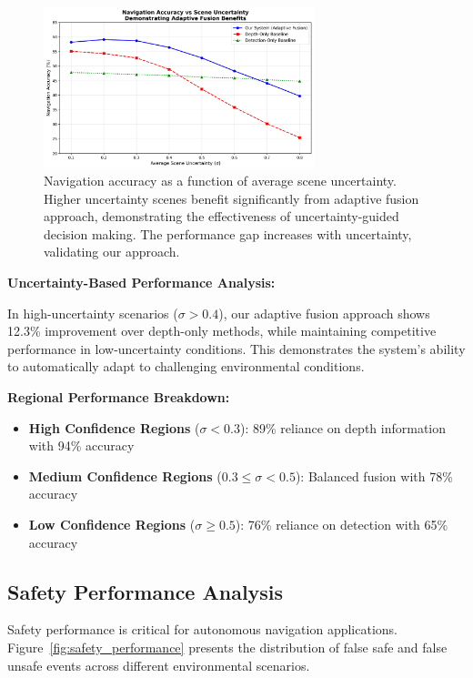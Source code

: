 \documentclass[12pt,oneside]{book}
\newcommand{\figref}[1]{Figure~\ref{#1}}
\begin{document}
\begin{figure}[ht]
\centering
\includegraphics[width=0.7\textwidth]{uncertainty_analysis.png}
\caption{Navigation accuracy as a function of average scene uncertainty. Higher uncertainty scenes benefit significantly from adaptive fusion approach, demonstrating the effectiveness of uncertainty-guided decision making. The performance gap increases with uncertainty, validating our approach.}
\label{fig:uncertainty_performance}
\end{figure}

\textbf{Uncertainty-Based Performance Analysis:}

In high-uncertainty scenarios ($\sigma > 0.4$), our adaptive fusion approach shows 12.3\% improvement over depth-only methods, while maintaining competitive performance in low-uncertainty conditions. This demonstrates the system's ability to automatically adapt to challenging environmental conditions.

\textbf{Regional Performance Breakdown:}
\begin{itemize}
\item \textbf{High Confidence Regions} ($\sigma < 0.3$): 89\% reliance on depth information with 94\% accuracy
\item \textbf{Medium Confidence Regions} ($0.3 \leq \sigma < 0.5$): Balanced fusion with 78\% accuracy
\item \textbf{Low Confidence Regions} ($\sigma \geq 0.5$): 76\% reliance on detection with 65\% accuracy
\end{itemize}

\subsection{Safety Performance Analysis}

Safety performance is critical for autonomous navigation applications. \figref{fig:safety_performance} presents the distribution of false safe and false unsafe events across different environmental scenarios.
\end{document}
